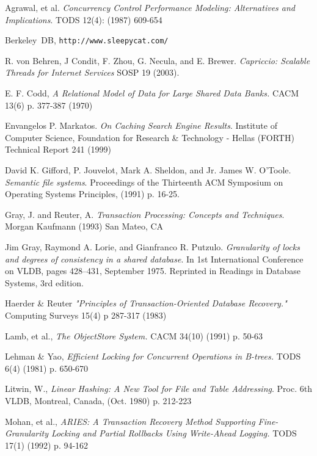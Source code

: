 \documentclass[letterpaper,twocolumn,english]{article}
\begin{document}
\begin{thebibliography}{99}

 Agrawal, et al. {\em Concurrency Control Performance Modeling: Alternatives and Implications}. TODS 12(4): (1987) 609-654

 Berkeley~DB, {\tt http://www.sleepycat.com/}

 R. von Behren, J Condit, F. Zhou, G. Necula, and E. Brewer. {\em Capriccio: Scalable Threads for Internet Services} SOSP 19 (2003).

 E. F. Codd, {\em A Relational Model of Data for Large Shared Data Banks.} CACM 13(6) p. 377-387 (1970)

 Envangelos P. Markatos. {\em On Caching Search Engine Results}.  Institute of Computer Science, Foundation for Research \& Technology - Hellas (FORTH) Technical Report 241 (1999)

 David K. Gifford, P. Jouvelot, Mark A. Sheldon, and Jr. James W. O'Toole. {\em Semantic file systems}. Proceedings of the Thirteenth ACM Symposium on Operating Systems Principles, (1991) p. 16-25.

 Gray, J. and Reuter, A. {\em Transaction Processing: Concepts and Techniques}. Morgan Kaufmann (1993) San Mateo, CA

 Jim Gray, Raymond A. Lorie, and Gianfranco R. Putzulo. {\em Granularity of locks and degrees of consistency in a shared database}. In 1st International Conference on VLDB, pages 428--431, September 1975. Reprinted in Readings in Database Systems, 3rd edition.

 Haerder \& Reuter {\em "Principles of Transaction-Oriented Database Recovery." } Computing Surveys 15(4) p 287-317 (1983)

 Lamb, et al., {\em The ObjectStore System.} CACM 34(10) (1991) p. 50-63

 Lehman \& Yao, {\em Efficient Locking for Concurrent Operations in B-trees.} TODS 6(4) (1981) p. 650-670

 Litwin, W., {\em Linear Hashing: A New Tool for File and Table Addressing}. Proc. 6th VLDB, Montreal, Canada, (Oct. 1980) p. 212-223

 Mohan, et al., {\em ARIES: A Transaction Recovery Method Supporting Fine-Granularity Locking and Partial Rollbacks Using Write-Ahead Logging.} TODS 17(1) (1992) p. 94-162


\end{thebibliography}
\end{document}
